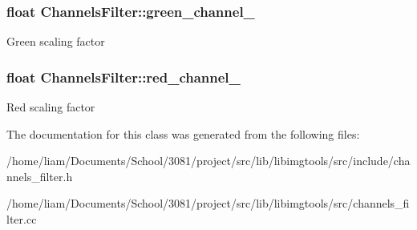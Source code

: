 \subsubsection[{\texorpdfstring{green\+\_\+channel\+\_\+}{green_channel_}}]{\setlength{\rightskip}{0pt plus 5cm}float Channels\+Filter\+::green\+\_\+channel\+\_\+\hspace{0.3cm}{\ttfamily [private]}}\hypertarget{classChannelsFilter_adf3f927d85cd418b0e2d254e20c88381}{}\label{classChannelsFilter_adf3f927d85cd418b0e2d254e20c88381}
Green scaling factor 
\subsubsection[{\texorpdfstring{red\+\_\+channel\+\_\+}{red_channel_}}]{\setlength{\rightskip}{0pt plus 5cm}float Channels\+Filter\+::red\+\_\+channel\+\_\+\hspace{0.3cm}{\ttfamily [private]}}\hypertarget{classChannelsFilter_ab844b335f0260f3b55b45be29da207a6}{}\label{classChannelsFilter_ab844b335f0260f3b55b45be29da207a6}
Red scaling factor 

The documentation for this class was generated from the following files\+:\begin{DoxyCompactItemize}
\item 
/home/liam/\+Documents/\+School/3081/project/src/lib/libimgtools/src/include/channels\+\_\+filter.\+h\item 
/home/liam/\+Documents/\+School/3081/project/src/lib/libimgtools/src/channels\+\_\+filter.\+cc\end{DoxyCompactItemize}
